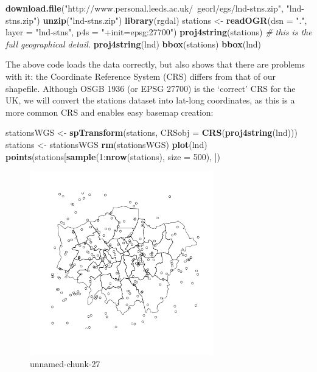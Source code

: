 \documentclass[]{article}
\newenvironment{Shaded}{}{}
\newcommand{\KeywordTok}[1]{\textcolor[rgb]{0.00,0.44,0.13}{\textbf{{#1}}}}
\newcommand{\DataTypeTok}[1]{\textcolor[rgb]{0.56,0.13,0.00}{{#1}}}
\newcommand{\DecValTok}[1]{\textcolor[rgb]{0.25,0.63,0.44}{{#1}}}
\newcommand{\StringTok}[1]{\textcolor[rgb]{0.25,0.44,0.63}{{#1}}}
\newcommand{\CommentTok}[1]{\textcolor[rgb]{0.38,0.63,0.69}{\textit{{#1}}}}
\newcommand{\NormalTok}[1]{{#1}}
\begin{document}
\begin{Shaded}
\begin{Highlighting}[]
\KeywordTok{download.file}\NormalTok{(}\StringTok{"http://www.personal.leeds.ac.uk/~georl/egs/lnd-stns.zip"}\NormalTok{, }\StringTok{"lnd-stns.zip"}\NormalTok{)}
\KeywordTok{unzip}\NormalTok{(}\StringTok{"lnd-stns.zip"}\NormalTok{)}
\KeywordTok{library}\NormalTok{(rgdal)}
\NormalTok{stations <- }\KeywordTok{readOGR}\NormalTok{(}\DataTypeTok{dsn =} \StringTok{"."}\NormalTok{, }\DataTypeTok{layer =} \StringTok{"lnd-stns"}\NormalTok{, }\DataTypeTok{p4s =} \StringTok{"+init=epsg:27700"}\NormalTok{)}
\KeywordTok{proj4string}\NormalTok{(stations)  }\CommentTok{# this is the full geographical detail.}
\KeywordTok{proj4string}\NormalTok{(lnd)}
\KeywordTok{bbox}\NormalTok{(stations)}
\KeywordTok{bbox}\NormalTok{(lnd)}
\end{Highlighting}
\end{Shaded}
The above code loads the data correctly, but also shows that there are
problems with it: the Coordinate Reference System (CRS) differs from
that of our shapefile. Although OSGB 1936 (or EPSG 27700) is the
`correct' CRS for the UK, we will convert the stations dataset into
lat-long coordinates, as this is a more common CRS and enables easy
basemap creation:

\begin{Shaded}
\begin{Highlighting}[]
\NormalTok{stationsWGS <- }\KeywordTok{spTransform}\NormalTok{(stations, }\DataTypeTok{CRSobj =} \KeywordTok{CRS}\NormalTok{(}\KeywordTok{proj4string}\NormalTok{(lnd)))}
\NormalTok{stations <- stationsWGS}
\KeywordTok{rm}\NormalTok{(stationsWGS)}
\KeywordTok{plot}\NormalTok{(lnd)}
\KeywordTok{points}\NormalTok{(stations[}\KeywordTok{sample}\NormalTok{(}\DecValTok{1}\NormalTok{:}\KeywordTok{nrow}\NormalTok{(stations), }\DataTypeTok{size =} \DecValTok{500}\NormalTok{), ])}
\end{Highlighting}
\end{Shaded}
\begin{figure}[htbp]
\centering
\includegraphics[width=8cm]{figure/unnamed-chunk-27.png}
\caption{unnamed-chunk-27}
\end{figure}
\end{document}
